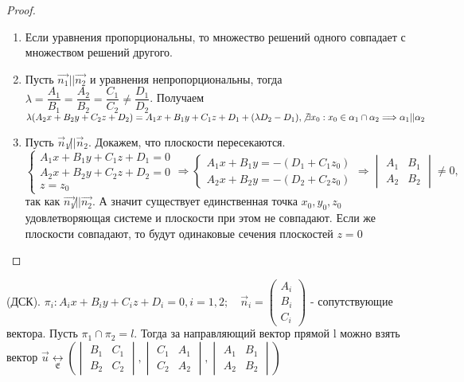 \begin{proof}
	\begin{enumerate}
		\item Если уравнения пропорциональны, то множество решений одного совпадает с множеством решений другого.
		\item Пусть $\vec{n_1} || \vec{n_2}$ и уравнения непропорциональны, тогда \(\lambda = \dfrac{A_1}{B_1} = \dfrac{A_2}{B_2} = \dfrac{C_1}{C_2} \ne \dfrac{D_1}{D_2}\). Получаем \newline
		\(\lambda(A_2x+B_2y+C_2z+D_2) = A_1x+B_1y+C_1z+D_1 + (\lambda D_2 - D_1), \not\exists x_0: x_0\in \alpha_1\cap\alpha_2\Longrightarrow \alpha_1 || \alpha_2\)
		\item Пусть \(\vec n_1 \not || \vec n_2\). Докажем, что плоскости пересекаются. $\left\{
		\begin{gathered}
			A_1x+B_1y+C_1z+D_1 = 0 \\
			A_2x+B_2y+C_2z+D_2 = 0 \\ 
			z= z_0
		\end{gathered}
		\right.\Longrightarrow \left\{
		\begin{gathered}
			A_1x+B_1y = -(D_1 + C_1z_0) \\
			A_2x+B_2y = -(D_2 + C_2z_0)
		\end{gathered}
		\right.\Longrightarrow \begin{vmatrix}
			A_1 & B_1 \\
			A_2 & B_2
		\end{vmatrix}\ne 0,$ так как $\vec{n_1}\not||\vec{n_2}$. А значит существует единственная точка \(x_0, y_0, z_0\) удовлетворяющая системе и плоскости при этом не совпадают. Если же плоскости совпадают, то будут одинаковые сечения плоскостей \(z = 0\)
	\end{enumerate}
\end{proof}
\begin{proposition}
	(ДСК). \(\pi_i: A_ix+B_iy+C_iz+D_i = 0, i = 1,2;\quad \vec n_i = 
	\begin{pmatrix}
		A_i \\ B_i \\ C_i
	\end{pmatrix}\) - сопутствующие вектора. Пусть \(\pi_1 \cap \pi_2 = l.\) Тогда за направляющий вектор прямой l можно взять вектор \(\vec u \underset{\mathfrak{E}}{\longleftrightarrow} (\begin{vmatrix}
	B_1 & C_1 \\ B_2 & C_2
	\end{vmatrix}, 
	\begin{vmatrix}
		C_1 & A_1 \\ C_2 & A_2
	\end{vmatrix}, 
	\begin{vmatrix}
		A_1 & B_1 \\ A_2 & B_2
	\end{vmatrix})\)
\end{proposition}
